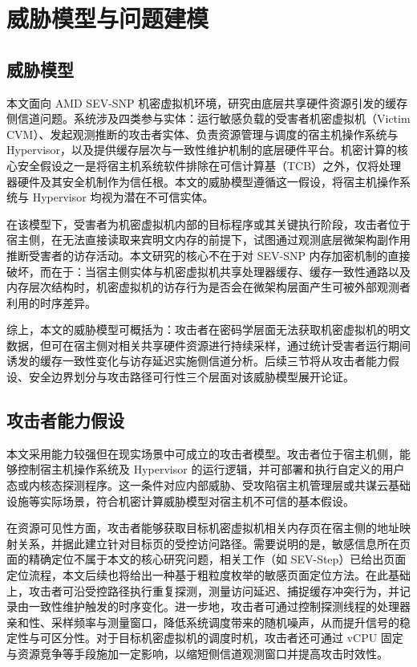 \chapter{威胁模型与问题建模}

\section{威胁模型}

本文面向 AMD SEV-SNP 机密虚拟机环境，研究由底层共享硬件资源引发的缓存侧信道问题。系统涉及四类参与实体：运行敏感负载的受害者机密虚拟机（Victim CVM）、发起观测推断的攻击者实体、负责资源管理与调度的宿主机操作系统与 Hypervisor，以及提供缓存层次与一致性维护机制的底层硬件平台。机密计算的核心安全假设之一是将宿主机系统软件排除在可信计算基（TCB）之外，仅将处理器硬件及其安全机制作为信任根\cite{ccc_whitepaper,amd_sev_snp_whitepaper}。本文的威胁模型遵循这一假设，将宿主机操作系统与 Hypervisor 均视为潜在不可信实体。

在该模型下，受害者为机密虚拟机内部的目标程序或其关键执行阶段，攻击者位于宿主侧，在无法直接读取来宾明文内存的前提下，试图通过观测底层微架构副作用推断受害者的访存活动。本文研究的核心不在于对 SEV-SNP 内存加密机制的直接破坏，而在于：当宿主侧实体与机密虚拟机共享处理器缓存、缓存一致性通路以及内存层次结构时，机密虚拟机的访存行为是否会在微架构层面产生可被外部观测者利用的时序差异\cite{chiang2025reloadreload,giner2025coherereload}。

综上，本文的威胁模型可概括为：攻击者在密码学层面无法获取机密虚拟机的明文数据，但可在宿主侧对相关共享硬件资源进行持续采样，通过统计受害者运行期间诱发的缓存一致性变化与访存延迟实施侧信道分析。后续三节将从攻击者能力假设、安全边界划分与攻击路径可行性三个层面对该威胁模型展开论证。

\section{攻击者能力假设}

本文采用能力较强但在现实场景中可成立的攻击者模型。攻击者位于宿主机侧，能够控制宿主机操作系统及 Hypervisor 的运行逻辑，并可部署和执行自定义的用户态或内核态探测程序。这一条件对应内部威胁、受攻陷宿主机管理层或共谋云基础设施等实际场景，符合机密计算威胁模型对宿主机不可信的基本假设\cite{kaplan2016amd,amd_sev_snp_whitepaper}。

在资源可见性方面，攻击者能够获取目标机密虚拟机相关内存页在宿主侧的地址映射关系，并据此建立针对目标页的受控访问路径。需要说明的是，敏感信息所在页面的精确定位不属于本文的核心研究问题，相关工作（如 SEV-Step\cite{wilke2024sevstep}）已给出页面定位流程，本文后续也将给出一种基于粗粒度枚举的敏感页面定位方法。在此基础上，攻击者可沿受控路径执行重复探测，测量访问延迟、捕捉缓存冲突行为，并记录由一致性维护触发的时序变化。进一步地，攻击者可通过控制探测线程的处理器亲和性、采样频率与测量窗口，降低系统调度带来的随机噪声，从而提升信号的稳定性与可区分性。对于目标机密虚拟机的调度时机，攻击者还可通过 vCPU 固定与资源竞争等手段施加一定影响，以缩短侧信道观测窗口并提高攻击时效性。

